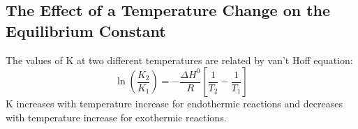 \documentclass[10pt]{article}
\begin{document}
\subsection*{The Effect of a Temperature Change on the Equilibrium Constant}
The values of K at two different temperatures are related by van't Hoff equation:
\[\ln \left(\frac{K_2}{K_1}\right) = - \frac{\Delta H^0}{R} \left[\frac{1}{T_2} - \frac{1}{T_1}\right]\]
K increases with temperature increase for endothermic reactions and decreases with temperature increase for exothermic reactions.
\end{document}
